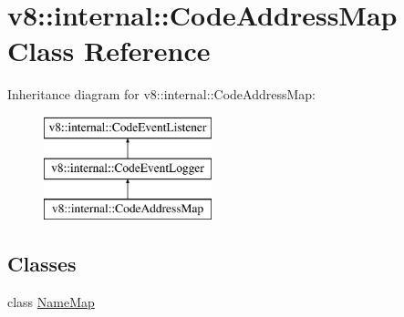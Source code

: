 \hypertarget{classv8_1_1internal_1_1_code_address_map}{}\section{v8\+:\+:internal\+:\+:Code\+Address\+Map Class Reference}
\label{classv8_1_1internal_1_1_code_address_map}
Inheritance diagram for v8\+:\+:internal\+:\+:Code\+Address\+Map\+:\begin{figure}[H]
\begin{center}
\leavevmode
\includegraphics[height=3.000000cm]{classv8_1_1internal_1_1_code_address_map}
\end{center}
\end{figure}
\subsection*{Classes}
\begin{DoxyCompactItemize}
\item 
class \hyperlink{classv8_1_1internal_1_1_code_address_map_1_1_name_map}{Name\+Map}
\end{DoxyCompactItemize}
